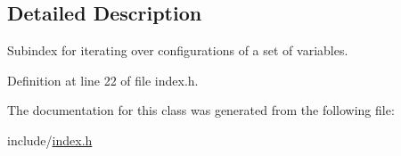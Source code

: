 \subsection{Detailed Description}
Subindex for iterating over configurations of a set of variables. 

Definition at line 22 of file index.\+h.



The documentation for this class was generated from the following file\+:\begin{DoxyCompactItemize}
\item 
include/\hyperlink{index_8h}{index.\+h}\end{DoxyCompactItemize}
